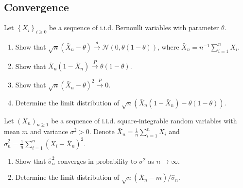 \begin{center}
  \section*{Convergence}
\end{center}

\begin{Exercise}
  Let $\left\{X_{i}\right\}_{i \geq 0}$ be a sequence of i.i.d. Bernoulli variables with parameter $\theta$.

  \begin{enumerate}
    \item Show that $\sqrt{n}\left(\bar{X}_{n}-\theta\right) \stackrel{d}{\longrightarrow} \mathcal{N}(0, \theta(1-\theta))$, where $\bar{X}_{n}=n^{-1} \sum_{i=1}^{n} X_{i}$.

    \item Show that $\bar{X}_{n}\left(1-\bar{X}_{n}\right) \stackrel{P}{\longrightarrow} \theta(1-\theta)$.

    \item Show that $\sqrt{n}\left(\bar{X}_{n}-\theta\right)^{2} \stackrel{P}{\longrightarrow} 0$.

    \item Determine the limit distribution of $\sqrt{n}\left(\bar{X}_{n}\left(1-\bar{X}_{n}\right)-\theta(1-\theta)\right)$.

  \end{enumerate}
\end{Exercise}

\begin{Exercise}
  Let $\left(X_{n}\right)_{n \geq 1}$ be a sequence of i.i.d. square-integrable random variables with mean $m$ and variance $\sigma^{2}>0$. Denote $\bar{X}_{n}=\frac{1}{n} \sum_{i=1}^{n} X_{i}$ and $\hat{\sigma}_{n}^{2}=\frac{1}{n} \sum_{i=1}^{n}\left(X_{i}-\bar{X}_{n}\right)^{2}$.

  \begin{enumerate}
    \item Show that $\hat{\sigma}_{n}^{2}$ converges in probability to $\sigma^{2}$ as $n \rightarrow \infty$.

    \item Determine the limit distribution of $\sqrt{n}\left(\bar{X}_{n}-m\right) / \hat{\sigma}_{n}$.

  \end{enumerate}
\end{Exercise}


